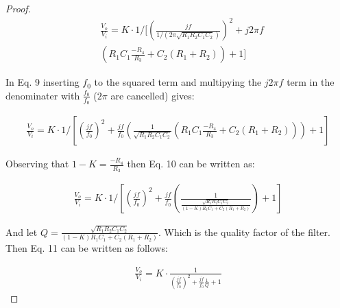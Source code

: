 \documentclass{article}
\begin{document}
\begin{proof}
\begin{equation}
\begin{aligned}
& \frac{V_o}{V_i} = K \cdot 1 / [ (\frac{j f}{1 / ( 2 \pi \sqrt{R_1 R_2 C_1 C_2} ) } )^2 + j 2 \pi f \\
& (R_1 C_1 \frac{-R_4}{R_3} + C_2 (R_1 + R_2) ) + 1 ]
\end {aligned}
\end{equation}

In Eq. 9 inserting \begin{math} f_0 \end{math} to the squared term and multipying the \begin{math}  j 2 \pi f \end{math} term in the denominater with \begin{math} \frac{f_0}{f_0} \end{math}
(\begin{math} 2 \pi \end{math} are cancelled)
gives:

\begin{equation}
\begin{aligned}
\frac{V_o}{V_i} = K \cdot 1 / [ (\frac{j f}{f_0})^2 + \frac{j f}{f_0} ( \frac{1}{ \sqrt{R_1 R_2 C_1 C_2}} (R_1 C_1 \frac{-R_4}{R_3} + C_2 (R_1 + R_2) ) ) + 1 ]
\end {aligned}
\end{equation}

Observing that \begin{math} 1-K = \frac{-R_4}{R_3} \end{math} then Eq. 10 can be written as:

\begin{equation}
\begin{aligned}
\frac{V_o}{V_i} = K \cdot 1 / [ (\frac{j f}{f_0})^2 + \frac{j f}{f_0} ( \frac{1}{\frac{\sqrt{R_1 R_2 C_1 C_2}}{(1-K) R_1 C_1 + C_2 ( R_1 + R_2)}}) + 1 ]
\end {aligned}
\end{equation}

And let \begin{math} Q = \frac{\sqrt{R_1 R_2 C_1 C_2}}{(1-K) R_1 C_1 + C_2 ( R_1 + R_2)} \end{math}. Which is the quality factor of the filter. Then Eq. 11 can be written as follows:

\begin{equation}
\begin{aligned}
\frac{V_o}{V_i} = K \cdot \frac{1}{(\frac{j f}{f_0})^2 +\frac{j f}{f_0} \frac{1}{Q} +1}
\end {aligned}
\end{equation}

\end{proof}
\end{document}
